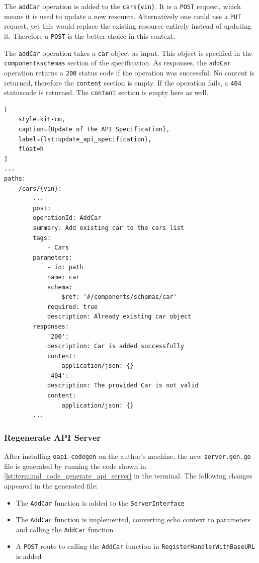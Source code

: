 The \texttt{addCar} operation is added to the \texttt{cars\/\{vin\}}.
It is a \texttt{POST} request, which means it is used to update a new resource.
Alternatively one could use a \texttt{PUT} request, yet this would replace the existing resource entirely instead of updating it.
Therefore a \texttt{POST} is the better choice in this context.

The \texttt{addCar} operation takes a \texttt{car} object as input.
This object is specified in the \texttt{components\/schemas} section of the specification.
As responses, the \texttt{addCar} operation returns a \texttt{200} status code if the operation was successful.
No content is returned, therefore the \texttt{content} section is empty.
If the operation fails, a \texttt{404} statuscode is returned.
The \texttt{content} section is empty here as well.

\begin{lstlisting}[
    style=kit-cm,
    caption={Update of the API Specification},
    label={lst:update_api_specification},
    float=h
]
...
paths:
    /cars/{vin}:
        ...
        post:
        operationId: AddCar
        summary: Add existing car to the cars list
        tags:
            - Cars
        parameters:
            - in: path
            name: car
            schema:
                $ref: '#/components/schemas/car'
            required: true
            description: Already existing car object
        responses:
            '200':
            description: Car is added successfully
            content:
                application/json: {}
            '404':
            description: The provided Car is not valid
            content:
                application/json: {}
        ...
\end{lstlisting}
\subsubsection*{Regenerate API Server}
After installing \texttt{oapi-codegen} on the author's machine, the new \texttt{server.gen.go} file is generated by running the code shown in \autoref{lst:terminal_code_generate_api_server} in the terminal.
The following changes appeared in the generated file:
\begin{itemize}
    \item The \texttt{AddCar} function is added to the \texttt{ServerInterface}
    \item The \texttt{AddCar} function is implemented, converting echo context to parameters and calling the \texttt{AddCar} function
    \item A \texttt{POST} route to calling the \texttt{AddCar} function in \texttt{RegisterHandlerWithBaseURL} is added
\end{itemize}

